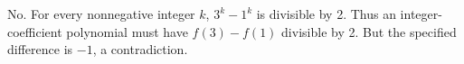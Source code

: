 No. For every nonnegative integer $k$, $3^k-1^k$ is divisible by 2. Thus an integer-coefficient polynomial must have $f(3)-f(1)$ divisible by 2. But the specified difference is $-1$, a contradiction.

